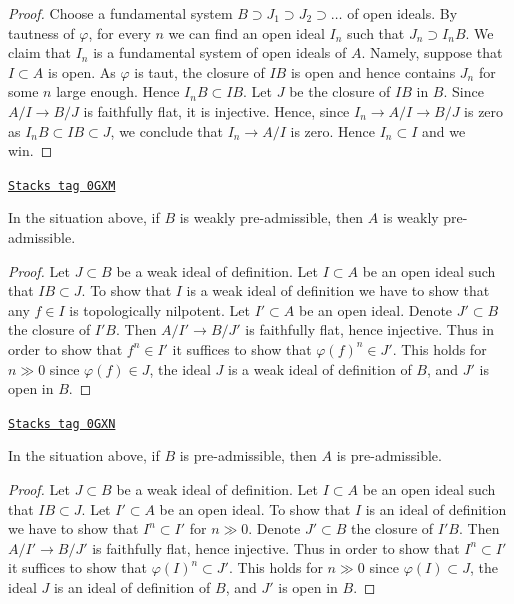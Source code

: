 \begin{proof}
Choose a fundamental system $B \supset J_1 \supset J_2 \supset \ldots$
of open ideals. By tautness of $\varphi$, for every $n$ we can find an
open ideal $I_n$ such that $J_n \supset I_nB$. We claim that
$I_n$ is a fundamental system of open ideals of $A$.
Namely, suppose that $I \subset A$ is open. As $\varphi$ is taut,
the closure of $IB$ is open and hence contains $J_n$ for some $n$
large enough. Hence $I_nB \subset IB$. Let $J$ be the closure of
$IB$ in $B$. Since $A/I \to B/J$ is faithfully flat, it is injective.
Hence, since $I_n \to A/I \to B/J$ is zero as $I_nB \subset IB \subset J$,
we conclude that $I_n \to A/I$ is zero. Hence $I_n \subset I$ and
we win.
\end{proof}

\begin{lemma}
\label{formal-spaces-lemma-taut-descent-weakly-admissible}
\href{https://stacks.math.columbia.edu/tag/0GXM}{\texttt{Stacks tag 0GXM}}

In the situation above, if $B$ is weakly pre-admissible, then
$A$ is weakly pre-admissible.
\end{lemma}

\begin{proof}
Let $J \subset B$ be a weak ideal of definition. Let $I \subset A$
be an open ideal such that $IB \subset J$. To show that $I$ is a weak ideal
of definition we have to show that any $f \in I$ is topologically nilpotent.
Let $I' \subset A$ be an open ideal. Denote $J' \subset B$ the closure
of $I'B$. Then $A/I' \to B/J'$ is faithfully flat, hence injective.
Thus in order to show that $f^n \in I'$ it suffices to show
that $\varphi(f)^n \in J'$. This holds for $n \gg 0$ since
$\varphi(f) \in J$, the ideal $J$ is a weak ideal of definition of $B$,
and $J'$ is open in $B$.
\end{proof}

\begin{lemma}
\label{formal-spaces-lemma-taut-descent-admissible}
\href{https://stacks.math.columbia.edu/tag/0GXN}{\texttt{Stacks tag 0GXN}}

In the situation above, if $B$ is pre-admissible, then $A$
is pre-admissible.
\end{lemma}

\begin{proof}
Let $J \subset B$ be a weak ideal of definition. Let $I \subset A$
be an open ideal such that $IB \subset J$. Let $I' \subset A$ be an open ideal.
To show that $I$ is an ideal of definition we have to show that
$I^n \subset I'$ for $n \gg 0$. Denote $J' \subset B$ the closure
of $I'B$. Then $A/I' \to B/J'$ is faithfully flat, hence injective.
Thus in order to show that $I^n \subset I'$ it suffices to show
that $\varphi(I)^n \subset J'$. This holds for $n \gg 0$ since
$\varphi(I) \subset J$, the ideal $J$ is an ideal of definition of $B$,
and $J'$ is open in $B$.
\end{proof}

